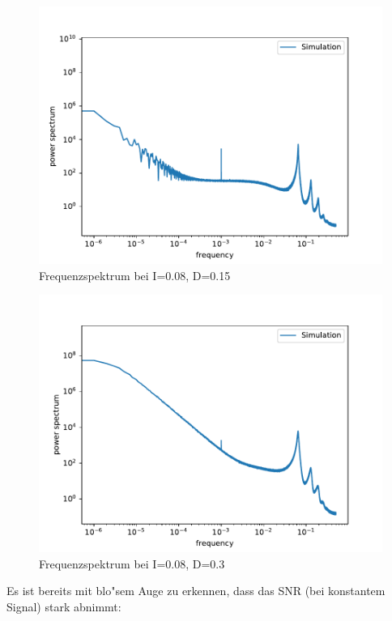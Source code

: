 \documentclass[12pt,a4paper]{article}
\begin{document}
\begin{figure}[H]
	\centering
	\includegraphics[scale=0.9]{inapikrealfast26jj59.pdf}
	\caption{Frequenzspektrum bei I=0.08, D=0.15}
	\label{deltaspectrum2}
\end{figure}
\begin{figure}[H]
	\centering
	\includegraphics[scale=0.9]{inapikrealfast26jj209.pdf}
	\caption{Frequenzspektrum bei I=0.08, D=0.3}
	\label{deltaspectrum3}
\end{figure}
Es ist bereits mit blo"sem Auge zu erkennen, dass das SNR (bei konstantem Signal) stark abnimmt:
\end{document}
